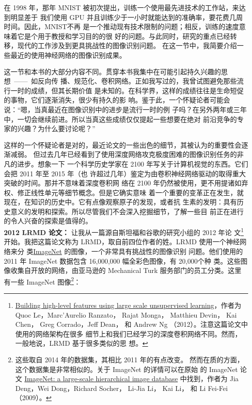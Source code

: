 在 1998 年，那年 MNIST 被初次提出，训练一个使用最先进技术的工作站，来达到明显差于
我们使用 GPU 并且训练少于一小时就能达到的准确率，要花费几周时间。因此，MNIST不再
是一个推动现有技术限制的问题；相反，训练的速度意味着它是个用于教授和学习目的的很
好的问题。与此同时，研究的重点已经转移，现代的工作涉及到更具挑战性的图像识别问题。
在这一节中，我简要介绍一些最近的使用神经网络的图像识别成果。

这一节和本书的大部分内容不同。贯穿本书我集中在可能引起持久兴趣的思想~——~如反向传
播、规范化、卷积网络。正如我写过的，我曾试图避免那些流行一时的成绩，但其长期价值
是未知的。在科学界，这样的成绩往往是生命短促的事物，它们逐渐消失，很少有持久的影
响。鉴于此，一个怀疑论者可能会说：“嗯，当真最近在图像识别中的进步是流行一时的例
子吗？在另外两年或三年中，一切会继续前进。所以当真这些成绩仅仅提起一些想要在绝对
前沿竞争的专家的兴趣？为什么要讨论呢？”

这样的一个怀疑论者是对的，最近论文的一些出色的细节，其被认为的重要性会逐渐减弱。
但过去几年已经看到了使用深度网络攻克极度困难的图像识别任务的非凡的进步。想象一下
一个科学历史学家在 2100 年写关于计算机视觉的东西。它们会把 2011 年至 2015 年（也
许超过几年）鉴定为由卷积神经网络驱动的取得重大突破的时间。那并不意味着深度卷积网
络在 2100 年仍然被使用，更不用提诸如弃权、修正线性单元等细节概念。但是它确实意味
着一个重要的变革正在发生，就现在，在知识的历史中。它有点像观察原子的发现，或者抗
生素的发明：具有历史意义的发明和探索。所以尽管我们不会深入挖掘细节，了解一些目
前正在进行的令人兴奋的探索是值得的。\\

\textbf{2012 LRMD 论文：} 让我从一篇源自斯坦福和谷歌的研究小组的 2012 年论
文\footnote{\href{http://research.google.com/pubs/pub38115.html}{Building
    high-level features using large scale unsupervised learning}，作者为 Quoc
  Le，Marc'Aurelio Ranzato， Rajat Monga， Matthieu Devin， Kai Chen， Greg
  Corrado，Jeff Dean， 和 Andrew Ng （2012）。注意这篇论文中使用的网络架构在很多
  细节上和我们已经学习的深度卷积网络不同。然而，一般地说，LRMD 基于很多类似的思
  想。}开始。我把这篇论文称为 LRMD，取自前四位作者的姓。LRMD 使用一个神经网络来分
类\href{http://www.image-net.org/}{ImageNet} 的图像，一个非常具有挑战性的图像识别
问题。他们使用的 2011 年 ImageNet 数据包含 16,000,000 幅全彩色图像，有 20,000个种
类。这些图像收集自开放的网络，由亚马逊的 Mechanical Turk 服务部门的员工分类。这里
有一些 ImageNet 图像\footnote{这些取自 2014 年的数据集，其相比 2011 年的有点改变。
  然而在质的方面，这个数据集是非常相似的。关于 ImageNet 的详情可以在原始
  的 ImageNet 论文 \href{http://www.image-net.org/papers/imagenet_cvpr09.pdf}{
    ImageNet: a large-scale hierarchical image database} 中找到，作者为 Jia
  Deng，Wei Dong，Richard Socher， Li-Jia Li， Kai Li， 和 Li
  Fei-Fei （2009）。}：

